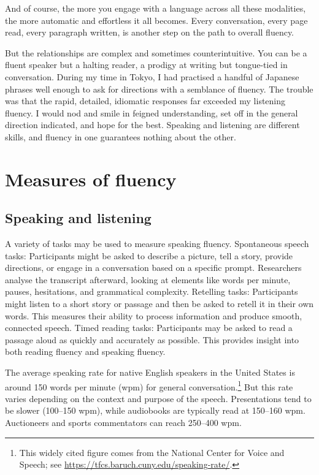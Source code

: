 And of course, the more you engage with a language across all these modalities, the more automatic and effortless it all becomes. Every conversation, every page read, every paragraph written, is another step on the path to overall fluency.

But the relationships are complex and sometimes counterintuitive. You can be a fluent speaker but a halting reader, a prodigy at writing but tongue-tied in conversation. During my time in Tokyo, I had practised a handful of Japanese phrases well enough to ask for directions with a semblance of fluency. The trouble was that the rapid, detailed, idiomatic responses far exceeded my listening fluency. I would nod and smile in feigned understanding, set off in the general direction indicated, and hope for the best. Speaking and listening are different skills, and fluency in one guarantees nothing about the other.



\section{Measures of fluency}

\subsection{Speaking and listening}

A variety of tasks may be used to measure speaking fluency. Spontaneous speech tasks: Participants might be asked to describe a picture, tell a story, provide directions, or engage in a conversation based on a specific prompt. Researchers analyse the transcript afterward, looking at elements like words per minute, pauses, hesitations, and grammatical complexity.
Retelling tasks: Participants might listen to a short story or passage and then be asked to retell it in their own words. This measures their ability to process information and produce smooth, connected speech.
Timed reading tasks: Participants may be asked to read a passage aloud as quickly and accurately as possible. This provides insight into both reading fluency and speaking fluency.

The average speaking rate for native English speakers in the United States is around 150 words per minute (wpm) for general conversation.\footnote{This widely cited figure comes from the National Center for Voice and Speech; see \url{https://tfcs.baruch.cuny.edu/speaking-rate/}.} But this rate varies depending on the context and purpose of the speech. Presentations tend to be slower (100--150 wpm), while audiobooks are typically read at 150--160 wpm. Auctioneers and sports commentators can reach 250--400 wpm.


